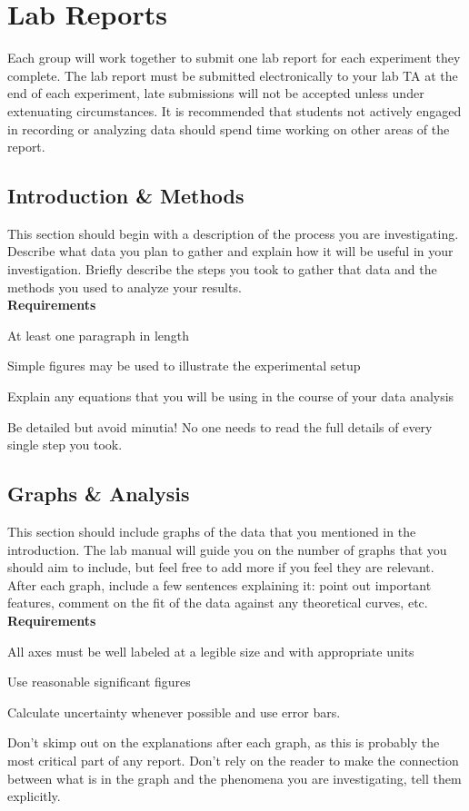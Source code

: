 \newpage

\section*{Lab Reports}
Each group will work together to submit one lab report for each experiment they complete.
The lab report must be submitted electronically to your lab TA at the end of each experiment, late submissions will not be accepted unless under extenuating circumstances.
It is recommended that students not actively engaged in recording or analyzing data should spend time working on other areas of the report.

\subsection*{Introduction \& Methods}
This section should begin with a description of the process you are investigating.
Describe what data you plan to gather and explain how it will be useful in your investigation.
Briefly describe the steps you took to gather that data and the methods you used to analyze your results. \\
\textbf{Requirements}
\begin{list}{-}{\topsep=0pt \itemsep=0pt}
	\item At least one paragraph in length
	\item Simple figures may be used to illustrate the experimental setup
	\item Explain any equations that you will be using in the course of your data analysis
	\item Be detailed but avoid minutia! No one needs to read the full details of every single step you took. 
\end{list}

\subsection*{Graphs \& Analysis}
This section should include graphs of the data that you mentioned in the introduction.
The lab manual will guide you on the number of graphs that you should aim to include, but feel free to add more if you feel they are relevant.
After each graph, include a few sentences explaining it: point out important features, comment on the fit of the data against any theoretical curves, etc. \\
\textbf{Requirements}
\begin{list}{-}{\topsep=0pt \itemsep=0pt}
	\item All axes must be well labeled at a legible size and with appropriate units
	\item Use reasonable significant figures
	\item Calculate uncertainty whenever possible and use error bars.
	\item Don't skimp out on the explanations after each graph, as this is probably the most critical part of any report. Don't rely on the reader to make the connection between what is in the graph and the phenomena you are investigating, tell them explicitly.
\end{list}

